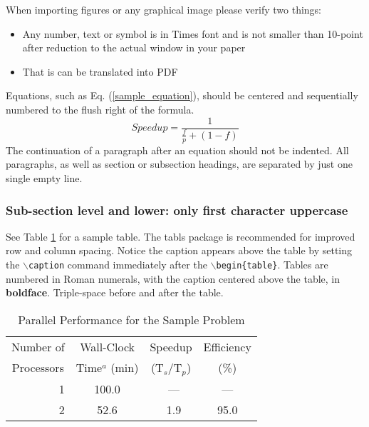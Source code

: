 \documentclass{ansconf}
\begin{document}
When importing figures or any graphical image please verify two things:
\begin{itemize}
\item Any number, text or symbol is in Times font and is not smaller than 
    10-point after reduction to the actual window in your paper
\item That is can be translated into PDF
\end{itemize}


Equations, such as Eq. (\ref{sample_equation}), should be centered and 
sequentially numbered to the flush right of the formula.
\begin{equation}
  \label{sample_equation}
  Speedup = \frac{1}{\frac{f}{p} + (1-f)}
\end{equation}
The continuation of a paragraph after an equation should not be indented.  
All paragraphs, as well as section or subsection headings, are separated by 
just one single empty line.


\subsubsection{Sub-section level and lower: only first character uppercase}

See Table \ref{table:example} for a sample table.  The tabls package is
recommended for improved row and column spacing.  Notice the caption appears 
above the table by setting the \texttt{$\backslash$caption} command immediately 
after the \texttt{$\backslash$begin\{table\}}. Tables are numbered in Roman 
numerals, with the caption centered above the table, in {\bf boldface}.  
Triple-space before and after the table.

\vspace{16pt}
\begin{table}[!htb]
\centering
\caption{Parallel Performance for the Sample Problem}
\label{table:example} 
\vspace{14pt}
\begin{tabular}{||r||c|c|c||} \hline \hline
 \multicolumn{1}{||c||}{Number of} &
 \multicolumn{1}{c|}{Wall-Clock} &
 \multicolumn{1}{c|}{Speedup} &
 \multicolumn{1}{c||}{Efficiency} \\
 \multicolumn{1}{||c||}{Processors} &
 \multicolumn{1}{c|}{Time$^{a}$ (min)} &
 \multicolumn{1}{c|}{(T$_{s}$/T$_{p}$)} &
 \multicolumn{1}{c||}{(\%)} \\ \hline\hline
\ 1 &  100.0 & \ ---    & ---  \\ \hline
\ 2 &   52.6 & \ 1.9    & 95.0 \\ \hline \hline
\end{tabular}
\end{table}
\vspace{16pt}
\end{document}
